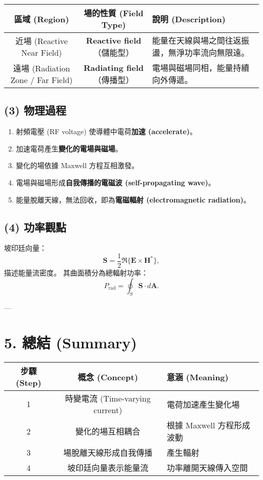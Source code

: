 \documentclass[12pt,a4paper]{article}
\begin{document}
\begin{center}
\renewcommand{\arraystretch}{1.3}
\setlength{\tabcolsep}{6pt}
\begin{tabularx}{\textwidth}{|c|c|X|}
\hline
\textbf{區域 (Region)} & \textbf{場的性質 (Field Type)} & \textbf{說明 (Description)} \\
\hline
近場 (Reactive Near Field) & \textbf{Reactive field}（儲能型） & 能量在天線與場之間往返振盪，無淨功率流向無限遠。 \\
\hline
遠場 (Radiation Zone / Far Field) & \textbf{Radiating field}（傳播型） & 電場與磁場同相，能量持續向外傳遞。 \\
\hline
\end{tabularx}
\end{center}

\subsection*{(3) 物理過程}
\begin{enumerate}
    \item 射頻電壓 (RF voltage) 使導體中電荷\textbf{加速 (accelerate)}。
    \item 加速電荷產生\textbf{變化的電場與磁場}。
    \item 變化的場依據 Maxwell 方程互相激發。
    \item 電場與磁場形成\textbf{自我傳播的電磁波 (self-propagating wave)}。
    \item 能量脫離天線，無法回收，即為\textbf{電磁輻射 (electromagnetic radiation)}。
\end{enumerate}

\subsection*{(4) 功率觀點}

坡印廷向量：
\[
\mathbf{S} = \frac{1}{2}\Re\{\mathbf{E}\times\mathbf{H}^*\},
\]
描述能量流密度。  
其曲面積分為總輻射功率：
\[
P_{\text{rad}} = \oint_S \mathbf{S}\cdot d\mathbf{A}.
\]

---

\section*{5. 總結 (Summary)}

\begin{center}
\renewcommand{\arraystretch}{1.3}
\setlength{\tabcolsep}{6pt}
\begin{tabularx}{\textwidth}{|c|c|X|}
\hline
步驟 (Step) & 概念 (Concept) & 意涵 (Meaning) \\
\hline
1 & 時變電流 (Time-varying current) & 電荷加速產生變化場 \\
\hline
2 & 變化的場互相耦合 & 根據 Maxwell 方程形成波動 \\
\hline
3 & 場脫離天線形成自我傳播 & 產生輻射 \\
\hline
4 & 坡印廷向量表示能量流 & 功率離開天線傳入空間 \\
\hline
\end{tabularx}
\end{center}
\end{document}
